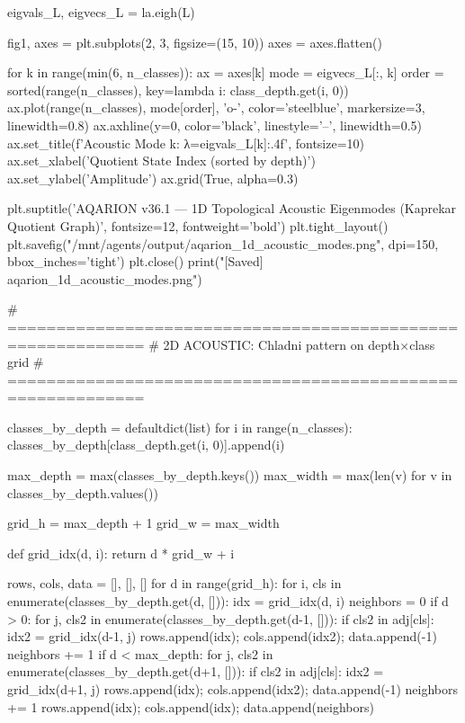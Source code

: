 {{{{{{{{{{{{{eigvals_L, eigvecs_L = la.eigh(L)

fig1, axes = plt.subplots(2, 3, figsize=(15, 10))
axes = axes.flatten()

for k in range(min(6, n_classes)):
    ax = axes[k]
    mode = eigvecs_L[:, k]
    order = sorted(range(n_classes), key=lambda i: class_depth.get(i, 0))
    ax.plot(range(n_classes), mode[order], 'o-', color='steelblue', markersize=3, linewidth=0.8)
    ax.axhline(y=0, color='black', linestyle='--', linewidth=0.5)
    ax.set_title(f'Acoustic Mode {k}: λ={eigvals_L[k]:.4f}', fontsize=10)
    ax.set_xlabel('Quotient State Index (sorted by depth)')
    ax.set_ylabel('Amplitude')
    ax.grid(True, alpha=0.3)

plt.suptitle('AQARION v36.1 — 1D Topological Acoustic Eigenmodes (Kaprekar Quotient Graph)', 
             fontsize=12, fontweight='bold')
plt.tight_layout()
plt.savefig("/mnt/agents/output/aqarion_1d_acoustic_modes.png", dpi=150, bbox_inches='tight')
plt.close()
print("[Saved] aqarion_1d_acoustic_modes.png")

# ============================================================
# 2D ACOUSTIC: Chladni pattern on depth×class grid
# ============================================================

classes_by_depth = defaultdict(list)
for i in range(n_classes):
    classes_by_depth[class_depth.get(i, 0)].append(i)

max_depth = max(classes_by_depth.keys())
max_width = max(len(v) for v in classes_by_depth.values())

grid_h = max_depth + 1
grid_w = max_width

def grid_idx(d, i):
    return d * grid_w + i

rows, cols, data = [], [], []
for d in range(grid_h):
    for i, cls in enumerate(classes_by_depth.get(d, [])):
        idx = grid_idx(d, i)
        neighbors = 0
        if d > 0:
            for j, cls2 in enumerate(classes_by_depth.get(d-1, [])):
                if cls2 in adj[cls]:
                    idx2 = grid_idx(d-1, j)
                    rows.append(idx); cols.append(idx2); data.append(-1)
                    neighbors += 1
        if d < max_depth:
            for j, cls2 in enumerate(classes_by_depth.get(d+1, [])):
                if cls2 in adj[cls]:
                    idx2 = grid_idx(d+1, j)
                    rows.append(idx); cols.append(idx2); data.append(-1)
                    neighbors += 1
        rows.append(idx); cols.append(idx); data.append(neighbors)

}}}}}}}}}}}}}
